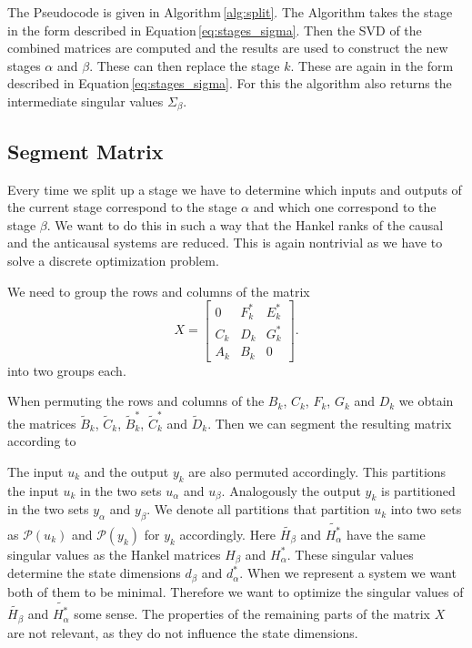 \documentclass[doctype=mastersthesis,BCOR=15mm,biblatex]{ldvbook}%
\newcommand{\partition}{\mathcal{P}}
\begin{document}
The Pseudocode is given in Algorithm\,\ref{alg:split}.
The Algorithm takes the stage in the form described in Equation\,\ref{eq:stages_sigma}.
Then the SVD of the combined matrices are computed and the results are used to construct the new stages $\alpha$ and $\beta$.
These can then replace the stage $k$.
These are again in the form described in Equation\,\ref{eq:stages_sigma}.
For this the algorithm also returns the intermediate singular values $\Sigma_\beta$.




\subsection{Segment Matrix}\label{subsec:segment_matrix}
Every time we split up a stage we have to determine which inputs and outputs of the current stage correspond to the stage $\alpha$ and which one correspond to the stage $\beta$.
We want to do this in such a way that the Hankel ranks of the causal and the anticausal systems are reduced.
This is again nontrivial as we have to solve a discrete optimization problem. 

We need to group the rows and columns of the matrix
\begin{equation}
X=
\begin{bmatrix}
	0   &F_k^* & E_k^*\\
	C_k & D_k & G_k^*\\
	A_k & B_k & 0
\end{bmatrix}
.
\end{equation}
into two groups each.

When permuting the rows and columns of the $B_k$, $C_k$, $F_k$, $G_k$ and $D_k$ we obtain the matrices $\tilde{B}_k$, $\tilde{C}_k$, $\tilde{B}_k^*$, $\tilde{C}_k^*$ and $\tilde{D}_k$.
Then we can segment the resulting matrix according to 



The input $u_k$ and the output $y_k$ are also permuted accordingly.
This partitions the input $u_k$ in the two sets $u_\alpha$ and $u_\beta$.
Analogously the output $y_k$ is partitioned in the two sets $y_\alpha$ and $y_\beta$.
We denote all partitions that partition $u_k$ into two sets as $\partition(u_k)$
and $\partition(y_k)$ for $y_k$ accordingly.
Here $\tilde{H_\beta}$ and $\tilde{H_\alpha^*}$ have the same singular values as the Hankel matrices $H_\beta$ and $H_\alpha^*$.
These singular values determine the state dimensions $d_\beta$ and $d_\alpha^*$.
When we represent a system we want both of them to be minimal.
Therefore we want to optimize the singular values of $\tilde{H_\beta}$ and $\tilde{H_\alpha^*}$ some sense. 
The properties of the remaining parts of the matrix $X$ are not relevant, as they do not influence the state dimensions.
\end{document}
